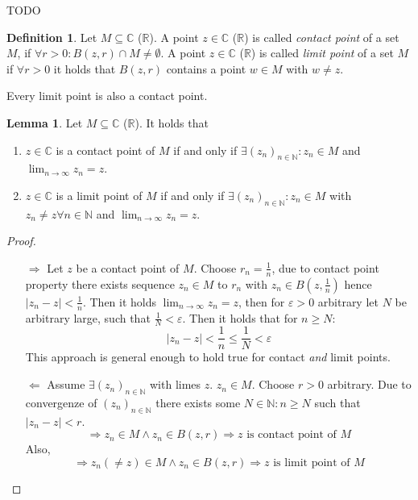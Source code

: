 \documentclass[a4paper,landscape,twocolumn]{article}
\theoremstyle{definition}
\newtheorem{defi}{Definition}
\newtheorem{lemma}{Lemma}
\newcommand\abs[1]{\left|#1\right|}
\newcommand\seq[1]{{\left(#1\right)}_{n \in \mathbb N}}
\begin{document}

TODO

\begin{defi}
  Let $M \subseteq \mathbb C$ ($\mathbb R$).
  A point $z \in \mathbb C$ ($\mathbb R$) is called \emph{contact point}
  of a set $M$, if $\forall r > 0: B(z, r) \cap M \neq \emptyset$.
  A point $z \in \mathbb C$ ($\mathbb R$) is called \emph{limit point}
  of a set $M$ if $\forall r > 0$ it holds that $B(z, r)$ contains a point
  $w \in M$ with $w \neq z$.

  Every limit point is also a contact point.
\end{defi}


\begin{lemma}
  \label{characterization-limit-contact-points}
  Let $M \subseteq \mathbb C$ ($\mathbb R$). It holds that
  \begin{enumerate}
    \item $z \in \mathbb C$ is a contact point of $M$
      if and only if $\exists (z_n)_{n \in \mathbb N}: z_n \in M$ and $\lim_{n\to\infty} z_n = z$.
    \item $z \in \mathbb C$ is a limit point of $M$
      if and only if $\exists (z_n)_{n \in \mathbb N}: z_n \in M$ with $z_n \neq z \forall n \in \mathbb N$
      and $\lim_{n\to\infty} z_n = z$.
  \end{enumerate}

\end{lemma}
\begin{proof}
  \begin{itemize}
    \item[$\Rightarrow$]
      Let $z$ be a contact point of $M$. Choose $r_n = \frac1n$, due to contact point property
      there exists sequence $z_n \in M$ to $r_n$ with $z_n \in B(z, \frac1n)$ hence $\abs{z_n - z} < \frac1n$.
      Then it holds $\lim_{n\to\infty} z_n = z$, then for $\varepsilon > 0$ arbitrary let $N$ be arbitrary large,
      such that $\frac1N < \varepsilon$. Then it holds that for $n \geq N$:
      \[ \abs{z_n - z} < \frac1n \leq \frac1N < \varepsilon \]
      This approach is general enough to hold true for contact \emph{and} limit points.
    \item[$\Leftarrow$] Assume $\exists \seq{z_n}$ with limes $z$. $z_n \in M$.
      Choose $r > 0$ arbitrary. Due to convergenze of $\seq{z_n}$ there exists some
      $N \in \mathbb N: n \geq N$ such that $\abs{z_n - z} < r$.
      \[ \Rightarrow z_n \in M \land z_n \in B(z, r) \Rightarrow z \text{ is contact point of $M$} \]
      Also,
      \[ \Rightarrow z_n (\neq z) \in M \land z_n \in B(z, r) \Rightarrow z \text{ is limit point of $M$} \]
  \end{itemize}
\end{proof}
\end{document}
